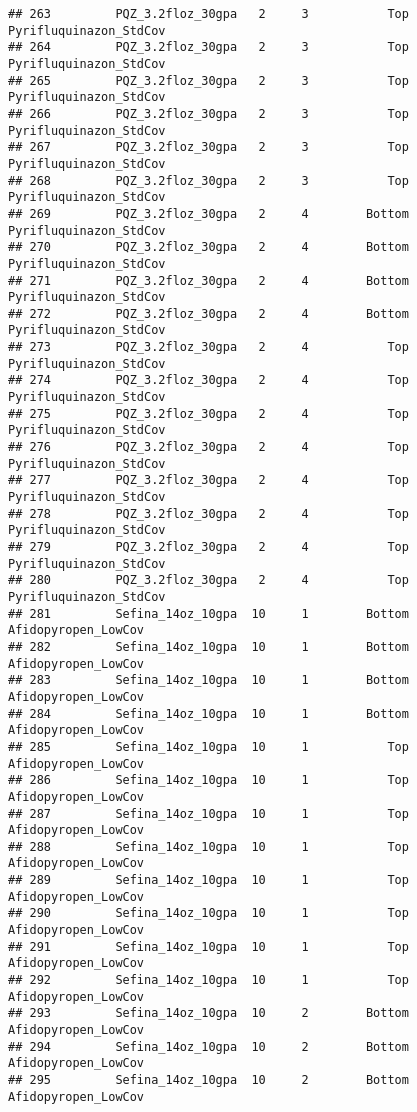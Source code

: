 \documentclass[
]{article}
\begin{document}
\begin{verbatim}
## 263         PQZ_3.2floz_30gpa   2     3           Top Pyrifluquinazon_StdCov
## 264         PQZ_3.2floz_30gpa   2     3           Top Pyrifluquinazon_StdCov
## 265         PQZ_3.2floz_30gpa   2     3           Top Pyrifluquinazon_StdCov
## 266         PQZ_3.2floz_30gpa   2     3           Top Pyrifluquinazon_StdCov
## 267         PQZ_3.2floz_30gpa   2     3           Top Pyrifluquinazon_StdCov
## 268         PQZ_3.2floz_30gpa   2     3           Top Pyrifluquinazon_StdCov
## 269         PQZ_3.2floz_30gpa   2     4        Bottom Pyrifluquinazon_StdCov
## 270         PQZ_3.2floz_30gpa   2     4        Bottom Pyrifluquinazon_StdCov
## 271         PQZ_3.2floz_30gpa   2     4        Bottom Pyrifluquinazon_StdCov
## 272         PQZ_3.2floz_30gpa   2     4        Bottom Pyrifluquinazon_StdCov
## 273         PQZ_3.2floz_30gpa   2     4           Top Pyrifluquinazon_StdCov
## 274         PQZ_3.2floz_30gpa   2     4           Top Pyrifluquinazon_StdCov
## 275         PQZ_3.2floz_30gpa   2     4           Top Pyrifluquinazon_StdCov
## 276         PQZ_3.2floz_30gpa   2     4           Top Pyrifluquinazon_StdCov
## 277         PQZ_3.2floz_30gpa   2     4           Top Pyrifluquinazon_StdCov
## 278         PQZ_3.2floz_30gpa   2     4           Top Pyrifluquinazon_StdCov
## 279         PQZ_3.2floz_30gpa   2     4           Top Pyrifluquinazon_StdCov
## 280         PQZ_3.2floz_30gpa   2     4           Top Pyrifluquinazon_StdCov
## 281         Sefina_14oz_10gpa  10     1        Bottom    Afidopyropen_LowCov
## 282         Sefina_14oz_10gpa  10     1        Bottom    Afidopyropen_LowCov
## 283         Sefina_14oz_10gpa  10     1        Bottom    Afidopyropen_LowCov
## 284         Sefina_14oz_10gpa  10     1        Bottom    Afidopyropen_LowCov
## 285         Sefina_14oz_10gpa  10     1           Top    Afidopyropen_LowCov
## 286         Sefina_14oz_10gpa  10     1           Top    Afidopyropen_LowCov
## 287         Sefina_14oz_10gpa  10     1           Top    Afidopyropen_LowCov
## 288         Sefina_14oz_10gpa  10     1           Top    Afidopyropen_LowCov
## 289         Sefina_14oz_10gpa  10     1           Top    Afidopyropen_LowCov
## 290         Sefina_14oz_10gpa  10     1           Top    Afidopyropen_LowCov
## 291         Sefina_14oz_10gpa  10     1           Top    Afidopyropen_LowCov
## 292         Sefina_14oz_10gpa  10     1           Top    Afidopyropen_LowCov
## 293         Sefina_14oz_10gpa  10     2        Bottom    Afidopyropen_LowCov
## 294         Sefina_14oz_10gpa  10     2        Bottom    Afidopyropen_LowCov
## 295         Sefina_14oz_10gpa  10     2        Bottom    Afidopyropen_LowCov

\end{verbatim}
\end{document}

